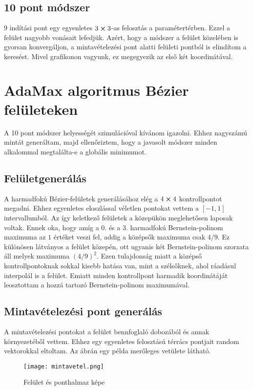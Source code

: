 \subsection{10 pont módszer}
$9$ indítási pont egy egyenletes $3\cross3$-as felosztás a paramétertérben. Ezzel a felület nagyobb vonásait lefedjük. Azért, hogy a módszer a felület közelében is gyorsan konvergáljon, a mintavételezési pont alatti felületi pontból is elindítom a keresést. Mivel grafikonon vagyunk, ez megegyezik az első két koordinátával.



\section{AdaMax algoritmus Bézier felületeken}
A 10 pont módszer helyességét szimulációval kívánom igazolni. Ehhez nagyszámú mintát generáltam, majd ellenőriztem, hogy a javasolt módszer minden alkalommal megtalálta-e a globális minimumot.

\subsection{Felületgenerálás}
A harmadfokú Bézier-felületek generálásához elég a $4\cross4$ kontrollpontot megadni. Ehhez egyenletes eloszlással véletlen pontokat vettem a $[-1,1]$ intervallumból. Az így keletkező felületek a közepükön meglehetősen laposak voltak. Ennek oka, hogy amíg a  $0.$ és a $3.$ harmadfokú Bernstein-polinom maximuma az $1$ értéket veszi fel, addig a középsők maximuma csak $4/9$. Ez különösen látványos a felület közepén, ott ugyanis két Bernstein-polinom szorzata áll melyek maximuma $(4/9)^2$. Ezen tulajdonság miatt a középső kontrollpontoknak sokkal kisebb hatása van, mint a szélsőknek, ahol ráadásul interpolál is a felület. Emiatt minden kontrollpont harmadik koordinátáját leosztottam a hozzá tartozó Bernstein-polinom maximumával.

\subsection{Mintavételezési pont generálás}
A mintavételezési pontokat a felület bennfoglaló dobozából és annak környezetéből vettem. Ehhez egy egyenletes felosztású térrács pontjait random vektorokkal eltoltam. Az ábrán egy példa merőleges vetülete látható.
\begin{figure}[H]
	\centering
	\texttt{[image: mintavetel.png]}
	\caption{Felület és ponthalmaz képe}
\end{figure}

